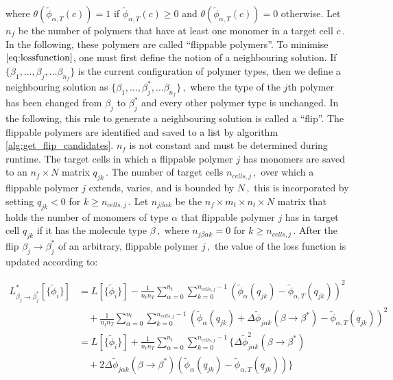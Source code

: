 \documentclass[bachelor,       %
               twoside,        %
               BCOR10mm,       %
               ngerman, english %
               ]{GAUBM}
\begin{document}
where $\theta(\tilde{\phi}_{\alpha,T}(c))=1$ if $\tilde{\phi}_{\alpha,T}(c)\ge 0$ and $\theta(\tilde{\phi}_{\alpha,T}(c))=0$ otherwise. Let $n_f$ be the number of polymers that have at least one monomer in a target cell $c\,.$ In the following, these polymers are called \enquote{flippable polymers}. To minimise $\eqref{eq:lossfunction}$, one must first define the notion of a neighbouring solution. If $\{\beta_1,\dots,\beta_j,\dots\beta_{n_f}\}$ is the current configuration of polymer types, then we define a neighbouring solution as $\{\beta_1,\dots,\beta^*_j,\dots\beta_{n_f}\}\,,$ where the type of the $j$th polymer has been changed from $\beta_j$ to $\beta_j^*$ and every other polymer type is unchanged. In the following, this rule to generate a neighbouring solution is called a \enquote{flip}. The flippable polymers are identified and saved to a list by algorithm \ref{alg:get_flip_candidates}. $n_f$ is not constant and must be determined during runtime. The target cells in which a flippable polymer $j$ has monomers are saved to an $n_f\times N$ matrix $q_{jk}\,.$ The number of target cells $n_{cells,j}\,,$ over which a flippable polymer $j$ extends, varies, and is bounded by $N\,,$ this is incorporated by setting $q_{jk}<0$ for $k\ge n_{cells,j}\,.$ Let $n_{j\beta\alpha k}$ be the $n_f\times m_t\times n_t\times N$ matrix that holds the number of monomers of type $\alpha$ that flippable polymer $j$ has in target cell $q_{jk}$ if it has the molecule type $\beta\,,$ where $n_{j\beta\alpha k}=0$ for $k\ge n_{cells,j}\,.$ After the flip $\beta_j\rightarrow \beta_j^*$ of an arbitrary, flippable polymer $j\,,$ the value of the loss function is updated according to:

\begin{align}
    L^*_{\beta_j\rightarrow\beta_j^*}[\{\tilde\phi_i\}] &= L[\{\tilde\phi_i\}] 
    - \frac{1}{n_tn_T}\sum_{\alpha=0}^{n_t}\sum_{k=0}^{n_{cells,j}-1}  \left(\tilde{\phi}_\alpha(q_{jk})-\tilde{\phi}_{\alpha,T}(q_{jk})\right)^2\nonumber \\
    & \quad + \frac{1}{n_tn_T}\sum_{\alpha=0}^{n_t}\sum_{k=0}^{n_{cells,j}-1}  \left(\tilde{\phi}_\alpha(q_{jk})+\Delta\tilde\phi_{ j\alpha k}(\beta\rightarrow\beta^*)-\tilde{\phi}_{\alpha,T}(q_{jk})\right)^2\nonumber \\
    &= L[\{\tilde\phi_i\}] 
    + \frac{1}{n_tn_T}\sum_{\alpha=0}^{n_t}\sum_{k=0}^{n_{cells,j}-1}  \biggl\{\Delta\tilde\phi^2_{ j\alpha k}(\beta\rightarrow\beta^*) \nonumber\\
    &\quad + 2\Delta\tilde\phi_{ j\alpha k}(\beta\rightarrow\beta^*)\left(\tilde\phi_{\alpha}(q_{jk})-\tilde\phi_{\alpha,T}(q_{jk})\right)\biggr\}
\end{align}
\end{document}
